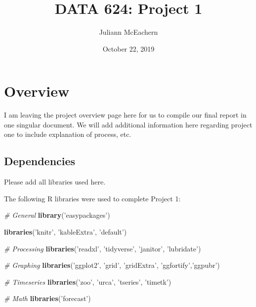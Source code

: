 \documentclass[openany]{book}
\title{DATA 624: Project 1}
\author{Juliann McEachern}
\date{October 22, 2019}
\newenvironment{Shaded}{\begin{snugshade}}{\end{snugshade}}
\newcommand{\CommentTok}[1]{\textcolor[rgb]{0.56,0.35,0.01}{\textit{#1}}}
\newcommand{\KeywordTok}[1]{\textcolor[rgb]{0.13,0.29,0.53}{\textbf{#1}}}
\newcommand{\NormalTok}[1]{#1}
\newcommand{\StringTok}[1]{\textcolor[rgb]{0.31,0.60,0.02}{#1}}
\renewenvironment{quote}{\begin{myquote}}{\end{myquote}}
\begin{document}
\maketitle

{
\setcounter{tocdepth}{1}
\tableofcontents
}
\hypertarget{overview}{%
\chapter*{Overview}\label{overview}}

\begin{quote}
I am leaving the project overview page here for us to compile our final
report in one singular document. We will add additional information here
regarding project one to include explanation of process, etc.
\end{quote}

\hypertarget{dependencies}{%
\section*{Dependencies}\label{dependencies}}

\begin{quote}
Please add all libraries used here.
\end{quote}

The following R libraries were used to complete Project 1:

\begin{Shaded}
\begin{Highlighting}[]
\CommentTok{# General}
\KeywordTok{library}\NormalTok{(}\StringTok{'easypackages'}\NormalTok{)}

\KeywordTok{libraries}\NormalTok{(}\StringTok{'knitr'}\NormalTok{, }\StringTok{'kableExtra'}\NormalTok{, }\StringTok{'default'}\NormalTok{)}

\CommentTok{# Processing}
\KeywordTok{libraries}\NormalTok{(}\StringTok{'readxl'}\NormalTok{, }\StringTok{'tidyverse'}\NormalTok{, }\StringTok{'janitor'}\NormalTok{, }\StringTok{'lubridate'}\NormalTok{)}

\CommentTok{# Graphing}
\KeywordTok{libraries}\NormalTok{(}\StringTok{'ggplot2'}\NormalTok{, }\StringTok{'grid'}\NormalTok{, }\StringTok{'gridExtra'}\NormalTok{, }\StringTok{'ggfortify'}\NormalTok{,}\StringTok{'ggpubr'}\NormalTok{)}

\CommentTok{# Timeseries }
\KeywordTok{libraries}\NormalTok{(}\StringTok{'zoo'}\NormalTok{, }\StringTok{'urca'}\NormalTok{, }\StringTok{'tseries'}\NormalTok{, }\StringTok{'timetk'}\NormalTok{)}

\CommentTok{# Math}
\KeywordTok{libraries}\NormalTok{(}\StringTok{'forecast'}\NormalTok{)}
\end{Highlighting}
\end{Shaded}
\end{document}
